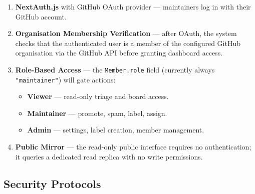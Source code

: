 \documentclass[12pt,a4paper]{report}
\begin{document}
\begin{enumerate}
  \item \textbf{NextAuth.js} with GitHub OAuth provider --- maintainers log in
    with their GitHub account.
  \item \textbf{Organisation Membership Verification} --- after OAuth, the
    system checks that the authenticated user is a member of the configured
    GitHub organisation via the GitHub API before granting dashboard access.
  \item \textbf{Role-Based Access} --- the \texttt{Member.role} field
    (currently always \texttt{"maintainer"}) will gate actions:
    \begin{itemize}
      \item \textbf{Viewer} --- read-only triage and board access.
      \item \textbf{Maintainer} --- promote, spam, label, assign.
      \item \textbf{Admin} --- settings, label creation, member management.
    \end{itemize}
  \item \textbf{Public Mirror} --- the read-only public interface requires no
    authentication; it queries a dedicated read replica with no write
    permissions.
\end{enumerate}

\subsection{Security Protocols}
\end{document}
